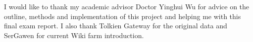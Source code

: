 \begin{acknowledgments}

I would like to thank my academic advisor Doctor Yinghui Wu for advice on the outline, methods and implementation of this project and helping me with this final exam report. I also thank Tolkien Gateway for the original data and SerGawen for current Wiki farm introduction.

\end{acknowledgments} 